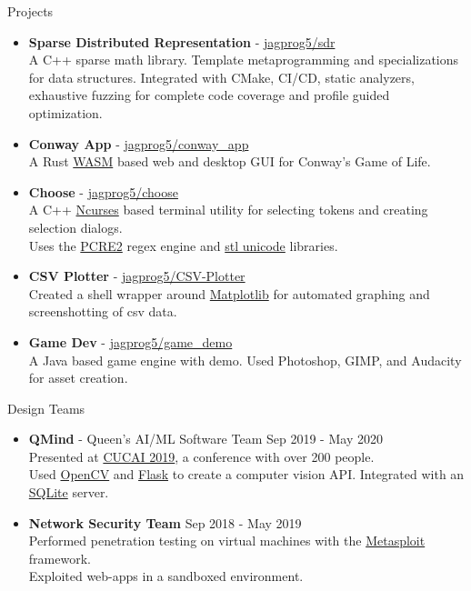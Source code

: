 \documentclass{resume} %
\begin{document}
\begin{rSection}{Projects}
    \begin{itemize}
        \item {\bf Sparse Distributed Representation} - \href{https://github.com/jagprog5/SDR/}{jagprog5/sdr}\\
        A C++ sparse math library. Template metaprogramming and specializations for data structures. Integrated with CMake, CI/CD, static analyzers, exhaustive fuzzing for complete code coverage and profile guided optimization.
        \item {\bf Conway App} - \href{https://github.com/jagprog5/conway_app/}{jagprog5/conway\_app}\\
        A Rust \href{https://webassembly.org/}{WASM} based web and desktop GUI for Conway's Game of Life.
        \item {\bf Choose} - \href{https://github.com/jagprog5/choose/}{jagprog5/choose}\\
        A C++ \href{https://en.wikipedia.org/wiki/Ncurses}{Ncurses} based terminal utility for selecting tokens and creating selection dialogs.\\
        Uses the \href{https://www.pcre.org/current/doc/html/}{PCRE2} regex engine and \href{https://en.cppreference.com/w/cpp/header/cwchar}{stl unicode} libraries.
        \item {\bf CSV Plotter} - \href{https://github.com/jagprog5/CSV-Plotter}{jagprog5/CSV-Plotter}\\
        Created a shell wrapper around \href{https://matplotlib.org/}{Matplotlib} for automated graphing and screenshotting of csv data. 
        \item {\bf Game Dev} - \href{https://github.com/jagprog5/GameDemo}{jagprog5/game\_demo}\\
        A Java based game engine with demo. Used Photoshop, GIMP, and Audacity for asset creation.
    \end{itemize}
\end{rSection}

\begin{rSection}{Design Teams}
    \begin{itemize}
        \item {\bf QMind} - Queen's AI/ML Software Team \hfill {Sep 2019 - May 2020}\\
        Presented at \href{https://medium.com/qmind-ai/cucai2019-c9d5f848f5c}{CUCAI 2019}, a conference with over 200 people.\\
        Used \href{https://opencv.org/}{OpenCV} and \href{https://flask.palletsprojects.com/en/2.2.x/}{Flask} to create a computer vision API.
        Integrated with an \href{https://www.sqlite.org/}{SQLite} server.
        \item {\bf Network Security Team} \hfill {Sep 2018 - May 2019}\\
        Performed penetration testing on virtual machines with the \href{https://www.metasploit.com/}{Metasploit} framework.\\
        Exploited web-apps in a sandboxed environment.
\end{itemize}
\end{rSection}
\end{document}
